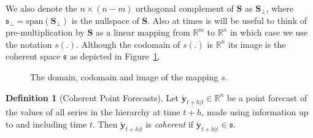 \documentclass[a4paper, 11pt]{article}
\theoremstyle{theo}
\theoremstyle{definition}
\newtheorem{definition}{Definition}[section]
\begin{document}
We also denote the $n\times(n-m)$ orthogonal complement of $\bm{S}$ as $\bm{S}_{\perp}$, where $\mathfrak{s}_\perp=\mbox{span}\left(\bm{S}_{\perp}\right)$ is the nullspace of $\bm{S}$. Also at times is  will be useful to think of pre-multiplication by $\bm{S}$ as a linear mapping from $\mathbb{R}^m$ to $\mathbb{R}^n$ in which case we use the notation $s(.)$.  Although the codomain of $s(.)$ is $\mathbb{R}^n$ its image is the coherent space $\mathfrak{s}$ as depicted in Figure~\ref{fig2}.

\begin{figure}[H]
  \begin{center}
    \newline
  \end{center}
  \caption{The domain, codomain and image of the mapping $s$.}\label{fig2}
\end{figure}

\begin{definition}[Coherent Point Forecasts]\label{def:cohpoint}
  Let $\breve{\bm{y}}_{t+h|t} \in \mathbb{R}^n$ be a point forecast of the values of all series in the hierarchy at time $t+h$,  made using information up to and including time $t$.  Then $\breve{\bm{y}}_{t+h|t}$ is \emph{coherent} if $\breve{\bm{y}}_{t+h|t} \in \mathfrak{s}$. 
\end{definition}
\end{document}
